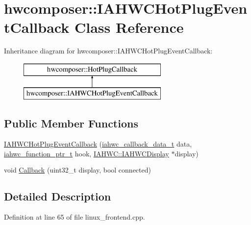 \hypertarget{classhwcomposer_1_1IAHWCHotPlugEventCallback}{}\section{hwcomposer\+:\+:I\+A\+H\+W\+C\+Hot\+Plug\+Event\+Callback Class Reference}
\label{classhwcomposer_1_1IAHWCHotPlugEventCallback}
Inheritance diagram for hwcomposer\+:\+:I\+A\+H\+W\+C\+Hot\+Plug\+Event\+Callback\+:\begin{figure}[H]
\begin{center}
\leavevmode
\includegraphics[height=2.000000cm]{classhwcomposer_1_1IAHWCHotPlugEventCallback}
\end{center}
\end{figure}
\subsection*{Public Member Functions}
\begin{DoxyCompactItemize}
\item 
\mbox{\hyperlink{classhwcomposer_1_1IAHWCHotPlugEventCallback_aaa1565ab0f86ac5b78118a5e9a9db977}{I\+A\+H\+W\+C\+Hot\+Plug\+Event\+Callback}} (\mbox{\hyperlink{iahwc_8h_a07fb4f73baa8a0cfbd40f64071e56a7c}{iahwc\+\_\+callback\+\_\+data\+\_\+t}} data, \mbox{\hyperlink{iahwc_8h_a214bf51cce821fdb7b24210088c12cad}{iahwc\+\_\+function\+\_\+ptr\+\_\+t}} hook, \mbox{\hyperlink{classhwcomposer_1_1IAHWC_1_1IAHWCDisplay}{I\+A\+H\+W\+C\+::\+I\+A\+H\+W\+C\+Display}} $\ast$display)
\item 
void \mbox{\hyperlink{classhwcomposer_1_1IAHWCHotPlugEventCallback_a06b3866efbc8e72c992e71357de1b4cb}{Callback}} (uint32\+\_\+t display, bool connected)
\end{DoxyCompactItemize}


\subsection{Detailed Description}


Definition at line 65 of file linux\+\_\+frontend.\+cpp.




